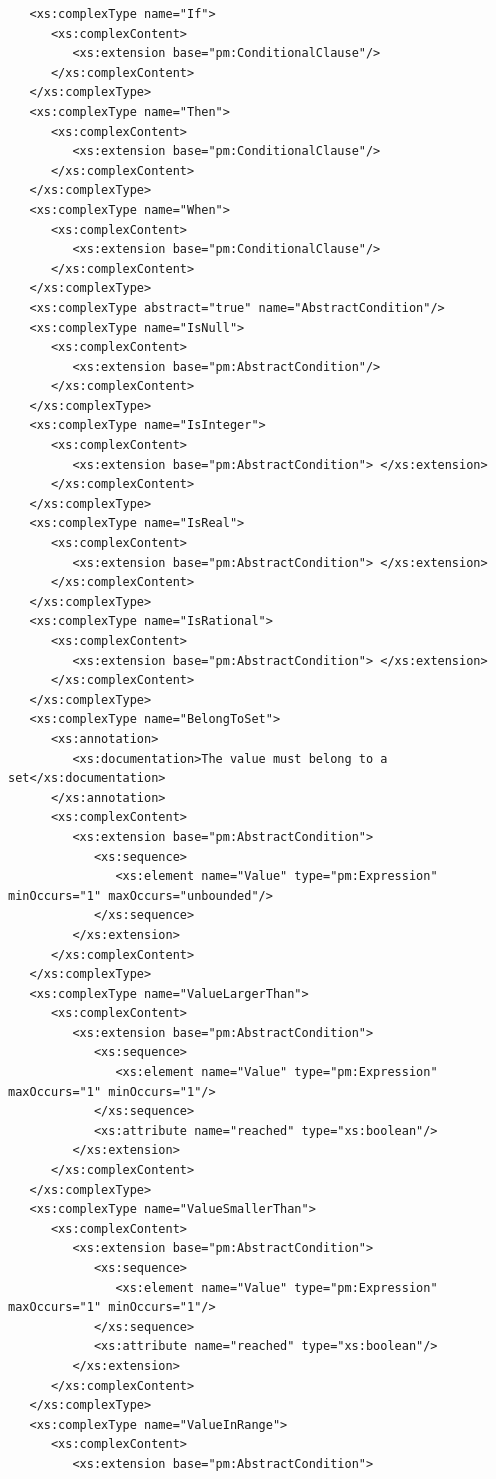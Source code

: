 \documentclass[a4paper,11pt] {ivoa}
\begin{document}
\begin{lstlisting}
   <xs:complexType name="If">
      <xs:complexContent>
         <xs:extension base="pm:ConditionalClause"/>
      </xs:complexContent>
   </xs:complexType>
   <xs:complexType name="Then">
      <xs:complexContent>
         <xs:extension base="pm:ConditionalClause"/>
      </xs:complexContent>
   </xs:complexType>
   <xs:complexType name="When">
      <xs:complexContent>
         <xs:extension base="pm:ConditionalClause"/>
      </xs:complexContent>
   </xs:complexType>
   <xs:complexType abstract="true" name="AbstractCondition"/>
   <xs:complexType name="IsNull">
      <xs:complexContent>
         <xs:extension base="pm:AbstractCondition"/>
      </xs:complexContent>
   </xs:complexType>
   <xs:complexType name="IsInteger">
      <xs:complexContent>
         <xs:extension base="pm:AbstractCondition"> </xs:extension>
      </xs:complexContent>
   </xs:complexType>
   <xs:complexType name="IsReal">
      <xs:complexContent>
         <xs:extension base="pm:AbstractCondition"> </xs:extension>
      </xs:complexContent>
   </xs:complexType>
   <xs:complexType name="IsRational">
      <xs:complexContent>
         <xs:extension base="pm:AbstractCondition"> </xs:extension>
      </xs:complexContent>
   </xs:complexType>
   <xs:complexType name="BelongToSet">
      <xs:annotation>
         <xs:documentation>The value must belong to a set</xs:documentation>
      </xs:annotation>
      <xs:complexContent>
         <xs:extension base="pm:AbstractCondition">
            <xs:sequence>
               <xs:element name="Value" type="pm:Expression" minOccurs="1" maxOccurs="unbounded"/>
            </xs:sequence>
         </xs:extension>
      </xs:complexContent>
   </xs:complexType>
   <xs:complexType name="ValueLargerThan">
      <xs:complexContent>
         <xs:extension base="pm:AbstractCondition">
            <xs:sequence>
               <xs:element name="Value" type="pm:Expression" maxOccurs="1" minOccurs="1"/>
            </xs:sequence>
            <xs:attribute name="reached" type="xs:boolean"/>
         </xs:extension>
      </xs:complexContent>
   </xs:complexType>
   <xs:complexType name="ValueSmallerThan">
      <xs:complexContent>
         <xs:extension base="pm:AbstractCondition">
            <xs:sequence>
               <xs:element name="Value" type="pm:Expression" maxOccurs="1" minOccurs="1"/>
            </xs:sequence>
            <xs:attribute name="reached" type="xs:boolean"/>
         </xs:extension>
      </xs:complexContent>
   </xs:complexType>
   <xs:complexType name="ValueInRange">
      <xs:complexContent>
         <xs:extension base="pm:AbstractCondition">

\end{lstlisting}
\end{document}
